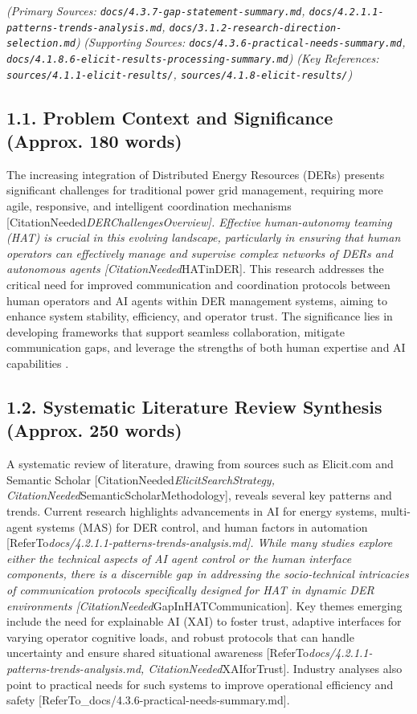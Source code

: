 \documentclass[12pt,a4paper]{article}
\begin{document}
\emph{(Primary Sources: \texttt{docs/4.3.7-gap-statement-summary.md}, \texttt{docs/4.2.1.1-patterns-trends-analysis.md}, \texttt{docs/3.1.2-research-direction-selection.md})}
\emph{(Supporting Sources: \texttt{docs/4.3.6-practical-needs-summary.md}, \texttt{docs/4.1.8.6-elicit-results-processing-summary.md})}
\emph{(Key References: \texttt{sources/4.1.1-elicit-results/}, \texttt{sources/4.1.8-elicit-results/})}

\subsection{1.1. Problem Context and Significance (Approx. 180 words)}
The increasing integration of Distributed Energy Resources (DERs) presents significant challenges for traditional power grid management, requiring more agile, responsive, and intelligent coordination mechanisms [CitationNeeded\emph{DERChallengesOverview]. Effective human-autonomy teaming (HAT) is crucial in this evolving landscape, particularly in ensuring that human operators can effectively manage and supervise complex networks of DERs and autonomous agents [CitationNeeded}HATinDER]. This research addresses the critical need for improved communication and coordination protocols between human operators and AI agents within DER management systems, aiming to enhance system stability, efficiency, and operator trust. The significance lies in developing frameworks that support seamless collaboration, mitigate communication gaps, and leverage the strengths of both human expertise and AI capabilities \cite{CitationNeeded_AIinDERManagement}.

\subsection{1.2. Systematic Literature Review Synthesis (Approx. 250 words)}
A systematic review of literature, drawing from sources such as Elicit.com and Semantic Scholar [CitationNeeded\emph{ElicitSearchStrategy, CitationNeeded}SemanticScholarMethodology], reveals several key patterns and trends. Current research highlights advancements in AI for energy systems, multi-agent systems (MAS) for DER control, and human factors in automation [ReferTo\emph{docs/4.2.1.1-patterns-trends-analysis.md]. While many studies explore either the technical aspects of AI agent control or the human interface components, there is a discernible gap in addressing the socio-technical intricacies of communication protocols specifically designed for HAT in dynamic DER environments [CitationNeeded}GapInHATCommunication]. Key themes emerging include the need for explainable AI (XAI) to foster trust, adaptive interfaces for varying operator cognitive loads, and robust protocols that can handle uncertainty and ensure shared situational awareness [ReferTo\emph{docs/4.2.1.1-patterns-trends-analysis.md, CitationNeeded}XAIforTrust]. Industry analyses also point to practical needs for such systems to improve operational efficiency and safety [ReferTo_docs/4.3.6-practical-needs-summary.md].
\end{document}
